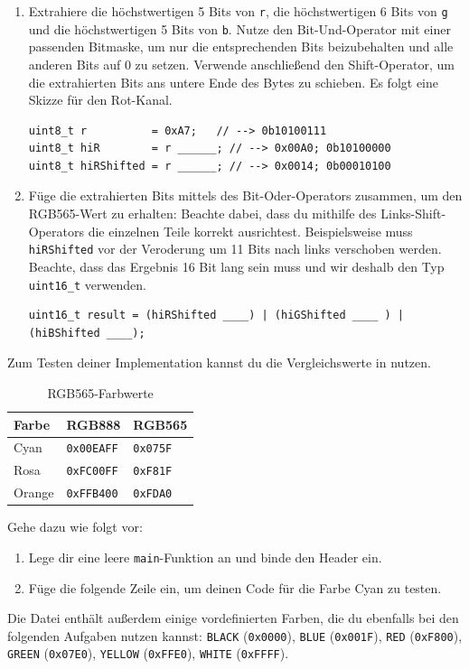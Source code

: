 \begin{enumerate}
\item 
Extrahiere die höchstwertigen 5 Bits von \lstinline|r|, die höchstwertigen 6 Bits von \lstinline|g| und die höchstwertigen 5 Bits von \lstinline|b|.
Nutze den Bit-Und-Operator mit einer passenden Bitmaske, um nur die entsprechenden Bits beizubehalten und alle anderen Bits auf 0 zu setzen.
Verwende anschließend den Shift-Operator, um die extrahierten Bits ans untere Ende des Bytes zu schieben.
Es folgt eine Skizze für den Rot-Kanal.
\begin{lstlisting}
uint8_t r          = 0xA7;   // --> 0b10100111
uint8_t hiR        = r ______; // --> 0x00A0; 0b10100000
uint8_t hiRShifted = r ______; // --> 0x0014; 0b00010100
\end{lstlisting}
\item 
Füge die extrahierten Bits mittels des Bit-Oder-Operators zusammen, um den RGB565-Wert zu erhalten:
Beachte dabei, dass du mithilfe des Links-Shift-Operators die einzelnen Teile korrekt ausrichtest.
Beispielsweise muss \lstinline|hiRShifted| vor der Veroderung um 11 Bits nach links verschoben werden.
Beachte, dass das Ergebnis 16 Bit lang sein muss und wir deshalb den Typ \lstinline|uint16_t| verwenden.
\begin{lstlisting}
uint16_t result = (hiRShifted ____) | (hiGShifted ____ ) | (hiBShifted ____);
\end{lstlisting}
\end{enumerate}
Zum Testen deiner Implementation kannst du die Vergleichswerte in  nutzen.
\begin{table}[]
	\centering
	\caption{RGB565-Farbwerte}
	\label{tab:rgb565Table}
	\begin{tabular}{lll}
        \toprule
		\textbf{Farbe} & \textbf{RGB888} & \textbf{RGB565} \\
        \midrule
		Cyan   & \lstinline|0x00EAFF| & \lstinline|0x075F| \\
		Rosa   & \lstinline|0xFC00FF| & \lstinline|0xF81F| \\
		Orange & \lstinline|0xFFB400| & \lstinline|0xFDA0| \\
        \bottomrule
	\end{tabular}
\end{table}
Gehe dazu wie folgt vor:
\begin{enumerate}
\item 
Lege dir eine leere \lstinline|main|-Funktion an und binde den Header  ein.
\item 
Füge die folgende Zeile ein, um deinen Code für die Farbe Cyan zu testen.
\end{enumerate}
Die Datei  enthält außerdem einige vordefinierten Farben, die du ebenfalls bei den folgenden Aufgaben nutzen kannst: \lstinline|BLACK| (\lstinline|0x0000|), \lstinline|BLUE| (\lstinline|0x001F|), \lstinline|RED| (\lstinline|0xF800|), \lstinline|GREEN| (\lstinline|0x07E0|), \lstinline|YELLOW| (\lstinline|0xFFE0|), \lstinline|WHITE| (\lstinline|0xFFFF|).


